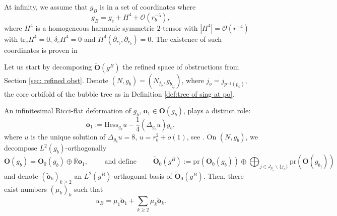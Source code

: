 \documentclass[11pt,reqno]{amsart}
\numberwithin{equation}{section}
\newcommand{\tr}{\mathrm{tr}}
\newcommand{\Hess}{\mathrm{Hess}}
\newcommand{\pr}{\mathrm{pr}}
\theoremstyle{definition}
\theoremstyle{remark}
\begin{document}
At infinity, we assume that $g_B$ is in a set of coordinates where 
$$ g_B = g_{e} + H^4 + \mathcal{O}(r_b^{-5}),$$
where $H^4$ is a homogeneous harmonic symmetric $2$-tensor with $|H^4| = \mathcal{O}(r^{-4})$ with $\tr_{e} H^4 = 0$, $\delta_{e} H^4 = 0$ and $H^4(\partial_{r_b},\partial_{r_b}) = 0$. The existence of such coordinates is proven in \cite[Lemma 11.12]{do3}


{
Let us start by decomposing $\tilde{\mathbf{O}}(g^B)$ the refined space of obstructions from Section \ref{sec: refined obst}. Denote $(N,g_{b}) = (N_{j_o},g_{b_{j_{o}}})$, where $j_o = j_{p^{-1}(p_o)}$, the core orbifold of the bubble tree as in Definition \ref{def:tree of sing at po}. 

An infinitesimal Ricci-flat deformation of $g_b$, $\mathbf{o}_1\in\mathbf{O}(g_b)$, plays a distinct role:
$$\mathbf{o}_1 := \Hess_{g_b}u - \frac14(\Delta_{g_b}u) g_b,$$
where $u$ is the unique solution of $\Delta_{g_b}u = 8$, $u=r_b^2+o(1)$, see \cite{bh,ozuthese}. On $(N,g_{b})$,  we decompose $L^2(g_b)$-orthogonally
$$\mathbf{O}(g_b) = \mathbf{O}_0(g_b) \overset{}{\oplus} \mathbb{R} \mathbf{o}_1, \qquad \text{ and define }\qquad\tilde{\mathbf{O}}_0(g^B) := \pr(\mathbf{O}_0(g_b)) \oplus \bigoplus_{j\in J_{p_o}\backslash\{j_{o}\}}\pr(\mathbf{O}(g_{b_j}))$$ and denote  $(\tilde{\mathbf{o}}_k)_{k\geqslant 2}$ an $L^2(g^B)$-orthogonal basis of $\tilde{\mathbf{O}}_0(g^B)$. Then, there exist numbers $(\mu_k)_k$ such that 
\begin{equation}\label{eq:decomposition uB}
    u_B = \mu_1\tilde{\mathbf{o}}_1 + \sum_{k\geqslant 2}\mu_k \tilde{\mathbf{o}}_k.
\end{equation}}
\end{document}
